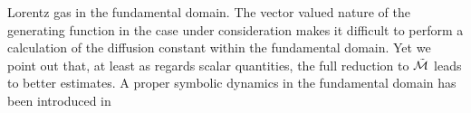 {Lorentz gas in the fundamental domain.}{
The vector valued nature of the generating function  in
the case under consideration makes it difficult to perform a calculation of
the diffusion constant within the fundamental domain.
Yet we point out that, at least as regards scalar quantities, the
full reduction to $\tilde{{\cal M}}$ leads to better estimates.
A proper symbolic dynamics in the fundamental domain has been
introduced in %
\PublicPrivate{.}{%
, numerical estimates for scalar
quantities are reported in \reftab{t-diff-5a}, taken from \refref{CGS}.
      }%
%
}

